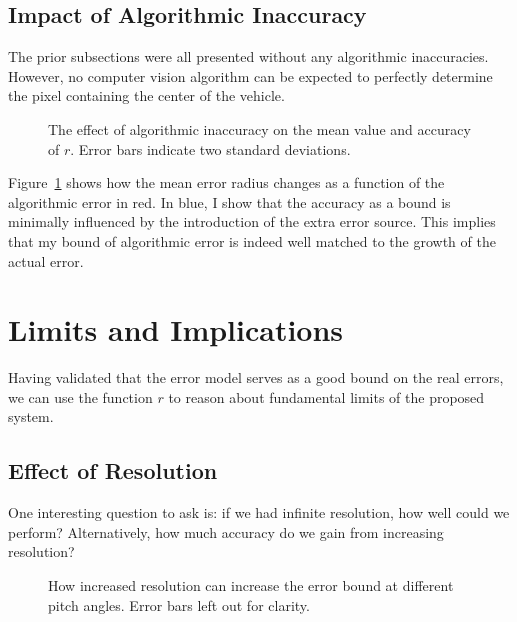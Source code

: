 \documentclass[a4paper,12pt,twoside,openright]{report}
\begin{document}
\subsection{Impact of Algorithmic Inaccuracy}

The prior subsections were all presented without any algorithmic inaccuracies.
However, no computer vision algorithm can be expected to perfectly determine
the pixel containing the center of the vehicle.

\begin{figure}[htb]
    \begin{center}
        
    \end{center}
    \caption[Effect of Algorithmic Inaccuracy]{The effect of algorithmic inaccuracy on the mean value and accuracy of $r$. Error bars indicate two standard deviations.}
    \label{fig:camera:algorithm effect}
\end{figure}


Figure~\ref{fig:camera:algorithm effect} shows how the mean error radius changes as a function of the 
algorithmic error in red. In blue, I show that the accuracy as a bound is minimally influenced 
by the introduction of the extra error source. This implies that my bound of
algorithmic error is indeed well matched to the growth of the actual error.


\section{Limits and Implications}
\label{sec:camera:implications}

Having validated that the error model serves as a good bound on the real errors, we can use the function $r$
to reason about fundamental limits of the proposed system.

\subsection{Effect of Resolution}

One interesting question to ask is: if we had infinite resolution,
how well could we perform? Alternatively, how much accuracy do we gain from increasing resolution?

\begin{figure}[htb]
    \begin{center}
        \resizebox{\linewidth}{!}{}
    \end{center}
    \caption[Resolution Limits]{How increased resolution can increase the error bound at different pitch angles. Error bars left out for clarity.}
    \label{fig:camera:resolution}
\end{figure}
 
\end{document}
